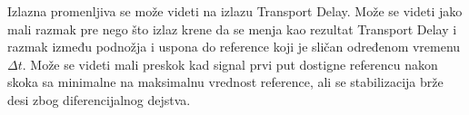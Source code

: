 \documentclass[10pt,a4paper,titlepage,croatian]{article}
\begin{document}
Izlazna promenljiva se može videti na izlazu Transport Delay. Može se videti jako mali razmak pre nego što izlaz krene da se menja kao rezultat Transport Delay i razmak između podnožja i uspona do reference koji je sličan određenom vremenu $\Delta t$. Može se videti mali preskok kad signal prvi put dostigne referencu nakon skoka sa minimalne na maksimalnu vrednost reference, ali se stabilizacija brže desi zbog diferencijalnog dejstva.
\end{document}
